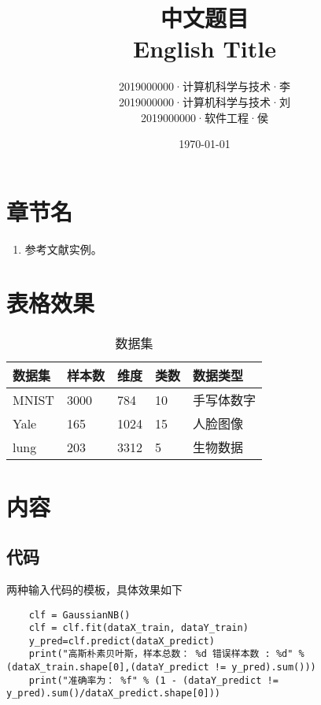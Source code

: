 \documentclass[UTF8,9pt]{ctexart}  %
\title{\heiti\fontsize{22}{\baselineskip} 中文题目 \\ \relax
\timesnewroman\fontsize{22}{\baselineskip} English Title}
\author{
\fangsong\fontsize{16}{\baselineskip} 2019000000·计算机科学与技术·李 \\ \relax
\fangsong\fontsize{16}{\baselineskip} 2019000000·计算机科学与技术·刘 \\ \relax
\fangsong\fontsize{16}{\baselineskip} 2019000000·软件工程·侯
}
\date{\today}
\begin{document}
 	\maketitle

	\newpage
	
	\section{章节名}
	\begin{enumerate}
		\item 参考文献实例。\cite{boss1997uncoupling}
	\end{enumerate}
	
	
	\section{表格效果}

	\begin{table}[htb]
		\centering
		\begin{tabular}{l l l l l}
			\hline
			
			数据集 & 样本数 & 维度 & 类数 & 数据类型 \\ \hline
			MNIST & 3000 & 784 & 10 & 手写体数字 \\ 
			Yale & 165 & 1024 & 15 & 人脸图像 \\ 
			lung & 203 & 3312 & 5 & 生物数据 \\ \hline
			
		\end{tabular}
		\caption{数据集}
	\end{table}



	\section{内容}
	
	\subsection{代码}
		两种输入代码的模板，具体效果如下
		


	\begin{lstlisting}
	clf = GaussianNB()
	clf = clf.fit(dataX_train, dataY_train)
	y_pred=clf.predict(dataX_predict)
	print("高斯朴素贝叶斯，样本总数： %d 错误样本数 : %d" % (dataX_train.shape[0],(dataY_predict != y_pred).sum()))
	print("准确率为： %f" % (1 - (dataY_predict != y_pred).sum()/dataX_predict.shape[0]))
	\end{lstlisting}
	
\end{document}
